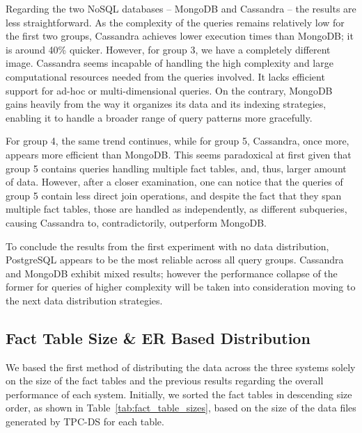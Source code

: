 \documentclass[conference]{IEEEtran}
\begin{document}
Regarding the two NoSQL databases – MongoDB and Cassandra – the results are less straightforward. As the complexity of the queries remains relatively low for the first two groups, Cassandra achieves lower execution times than MongoDB; it is around 40\% quicker. However, for group 3, we have a completely different image. Cassandra seems incapable of handling the high complexity and large computational resources needed from the queries involved. It lacks efficient support for ad-hoc or multi-dimensional queries. On the contrary, MongoDB gains heavily from the way it organizes its data and its indexing strategies, enabling it to handle a broader range of query patterns more gracefully.

For group 4, the same trend continues, while for group 5, Cassandra, once more, appears more efficient than MongoDB. This seems paradoxical at first given that group 5 contains queries handling multiple fact tables, and, thus, larger amount of data. However, after a closer examination, one can notice that the queries of group 5 contain less direct join operations, and despite the fact that they span multiple fact tables, those are handled as independently, as different subqueries, causing Cassandra to, contradictorily, outperform MongoDB.

To conclude the results from the first experiment with no data distribution, PostgreSQL appears to be the most reliable across all query groups. Cassandra and MongoDB exhibit mixed results; however the performance collapse of the former for queries of higher complexity will be taken into consideration moving to the next data distribution strategies.


\subsection{Fact Table Size \& ER Based Distribution}

We based the first method of distributing the data across the three systems solely on the size of the fact tables and the previous results regarding the overall performance of each system. Initially, we sorted the fact tables in descending size order, as shown in Table~\ref{tab:fact_table_sizes}, based on the size of the data files generated by TPC-DS for each table.
\end{document}
